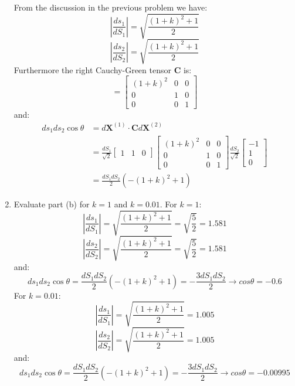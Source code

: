 \documentclass{article}
\newcommand{\ee}{\end{equation}}
\newcommand{\be}{\begin{equation}}
\newcommand{\bs}{\boldsymbol}
\begin{document}
\begin{enumerate}
From the discussion in the previous problem we have:
\be
|\frac{ds_1}{dS_1}|=\sqrt{\frac{(1+k)^2+1}{2}}
\ee
\be
|\frac{ds_2}{dS_2}|=\sqrt{\frac{(1+k)^2+1}{2}}
\ee
Furthermore the right Cauchy-Green tensor $\bs{C}$ is:
\be
[\bs{C}]=\left[\begin{array}{lll}  (1+k)^2 & 0 & 0 \\ 0 & 1 & 0 \\ 0 & 0 & 1                
               \end{array}
\right]
\ee
and:
\be
\begin{array}{ll}
ds_1ds_2\cos \theta & =d\bs{X}^{(1)}\cdot \bs{C}d\bs{X}^{(2)} \\
& =\frac{dS_1}{\sqrt{2}}  \left[\begin{array}{lll} 1 &1 &0 \end{array} \right]  \left[\begin{array}{lll}  (1+k)^2 & 0 & 0 \\ 0 & 1 & 0 \\ 0 & 0 & 1                
               \end{array}
\right] \frac{dS_2}{\sqrt{2}}  \left[\begin{array}{l} -1 \\1 \\0 \end{array} \right]\\
&=\frac{dS_1dS_2}{2}(-(1+k)^2+1)
\end{array}
\ee
\item Evaluate   part (b) for $k=1$ and $k=0.01$.
For $k=1$:
\be
|\frac{ds_1}{dS_1}|=\sqrt{\frac{(1+k)^2+1}{2}}=\sqrt{\frac{5}{2}}=1.581
\ee
\be
|\frac{ds_2}{dS_2}|=\sqrt{\frac{(1+k)^2+1}{2}}=\sqrt{\frac{5}{2}}=1.581
\ee
and:
\be
ds_1ds_2\cos \theta=\frac{dS_1dS_2}{2}(-(1+k)^2+1)=-\frac{3 dS_1dS_2}{2} \to cos\theta =-0.6
\ee
For $k=0.01$:
\be
|\frac{ds_1}{dS_1}|=\sqrt{\frac{(1+k)^2+1}{2}}=1.005
\ee
\be
|\frac{ds_2}{dS_2}|=\sqrt{\frac{(1+k)^2+1}{2}}=1.005
\ee
and:
\be
ds_1ds_2\cos \theta=\frac{dS_1dS_2}{2}(-(1+k)^2+1)=-\frac{3 dS_1dS_2}{2} \to cos\theta =-0.00995
\ee



\end{enumerate}
\end{document}
